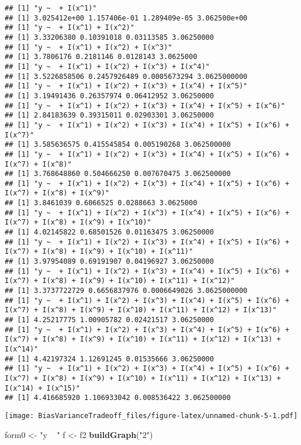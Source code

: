 \documentclass[]{article}
\newenvironment{Shaded}{\begin{snugshade}}{\end{snugshade}}
\newcommand{\KeywordTok}[1]{\textcolor[rgb]{0.13,0.29,0.53}{\textbf{#1}}}
\newcommand{\NormalTok}[1]{#1}
\newcommand{\StringTok}[1]{\textcolor[rgb]{0.31,0.60,0.02}{#1}}
\begin{document}
\begin{verbatim}
## [1] "y ~  + I(x^1)"
## [1] 3.025412e+00 1.157406e-01 1.289409e-05 3.062500e+00
## [1] "y ~  + I(x^1) + I(x^2)"
## [1] 3.33206380 0.10391018 0.03113585 3.06250000
## [1] "y ~  + I(x^1) + I(x^2) + I(x^3)"
## [1] 3.7806176 0.2181146 0.0128143 3.0625000
## [1] "y ~  + I(x^1) + I(x^2) + I(x^3) + I(x^4)"
## [1] 3.5226858506 0.2457926489 0.0005673294 3.0625000000
## [1] "y ~  + I(x^1) + I(x^2) + I(x^3) + I(x^4) + I(x^5)"
## [1] 3.19491436 0.26357974 0.06412952 3.06250000
## [1] "y ~  + I(x^1) + I(x^2) + I(x^3) + I(x^4) + I(x^5) + I(x^6)"
## [1] 2.84183639 0.39315011 0.02903301 3.06250000
## [1] "y ~  + I(x^1) + I(x^2) + I(x^3) + I(x^4) + I(x^5) + I(x^6) + I(x^7)"
## [1] 3.585636575 0.415545854 0.005190268 3.062500000
## [1] "y ~  + I(x^1) + I(x^2) + I(x^3) + I(x^4) + I(x^5) + I(x^6) + I(x^7) + I(x^8)"
## [1] 3.768648860 0.504666250 0.007670475 3.062500000
## [1] "y ~  + I(x^1) + I(x^2) + I(x^3) + I(x^4) + I(x^5) + I(x^6) + I(x^7) + I(x^8) + I(x^9)"
## [1] 3.8461039 0.6066525 0.0288663 3.0625000
## [1] "y ~  + I(x^1) + I(x^2) + I(x^3) + I(x^4) + I(x^5) + I(x^6) + I(x^7) + I(x^8) + I(x^9) + I(x^10)"
## [1] 4.02145822 0.68501526 0.01163475 3.06250000
## [1] "y ~  + I(x^1) + I(x^2) + I(x^3) + I(x^4) + I(x^5) + I(x^6) + I(x^7) + I(x^8) + I(x^9) + I(x^10) + I(x^11)"
## [1] 3.97954089 0.69191907 0.04196927 3.06250000
## [1] "y ~  + I(x^1) + I(x^2) + I(x^3) + I(x^4) + I(x^5) + I(x^6) + I(x^7) + I(x^8) + I(x^9) + I(x^10) + I(x^11) + I(x^12)"
## [1] 3.3737722729 0.6656837976 0.0006649026 3.0625000000
## [1] "y ~  + I(x^1) + I(x^2) + I(x^3) + I(x^4) + I(x^5) + I(x^6) + I(x^7) + I(x^8) + I(x^9) + I(x^10) + I(x^11) + I(x^12) + I(x^13)"
## [1] 4.25217775 1.00905782 0.02421517 3.06250000
## [1] "y ~  + I(x^1) + I(x^2) + I(x^3) + I(x^4) + I(x^5) + I(x^6) + I(x^7) + I(x^8) + I(x^9) + I(x^10) + I(x^11) + I(x^12) + I(x^13) + I(x^14)"
## [1] 4.42197324 1.12691245 0.01535666 3.06250000
## [1] "y ~  + I(x^1) + I(x^2) + I(x^3) + I(x^4) + I(x^5) + I(x^6) + I(x^7) + I(x^8) + I(x^9) + I(x^10) + I(x^11) + I(x^12) + I(x^13) + I(x^14) + I(x^15)"
## [1] 4.416685920 1.106933042 0.008536422 3.062500000
\end{verbatim}

\texttt{[image: BiasVarianceTradeoff\_files/figure-latex/unnamed-chunk-5-1.pdf]}

\begin{Shaded}
\begin{Highlighting}[]
\NormalTok{form0 <-}\StringTok{ "y ~ "}
\NormalTok{f <-}\StringTok{ }\NormalTok{f2}
\KeywordTok{buildGraph}\NormalTok{(}\StringTok{"2"}\NormalTok{)}
\end{Highlighting}
\end{Shaded}
\end{document}
